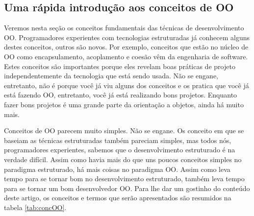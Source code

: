 \documentclass[
	article,			%
	12pt,				%
	openright,
	twoside,			%
	a4paper,			%
	english,			%
	french,
	brazil,				%
	sumario=tradicional
	]{abntex2}
\begin{document}
\subsection{Uma rápida introdução aos conceitos de OO}
Veremos nesta seção os conceitos fundamentais das técnicas de desenvolvimento OO. Programadores experientes com tecnologias estruturadas já conhecem alguns destes conceitos, outros são novos. Por exemplo, conceitos que estão no núcleo de OO como encapsulamento, acoplamento e coesão vêm da engenharia de software. Estes conceitos são importantes porque eles revelam boas práticas de projeto independentemente da tecnologia que está sendo usada. Não se engane, entretanto, não é porque você já viu alguns dos conceitos e os pratica que você já está fazendo OO, entretanto, você já está realizando bons projetos. Enquanto fazer bons projetos é uma grande parte da orientação a objetos, ainda há muito mais.

Conceitos de OO parecem muito simples. Não se engane. Os conceito em que se baseiam as técnicas estruturadas também pareciam simples, mas todos nós, programadores experientes, sabemos que o desenvolvimento estruturado é na verdade difícil. Assim como havia mais do que uns poucos conceitos simples no paradigma estruturado, há mais coisas no paradigma OO. Assim como leva tempo para se tornar bom no desenvolvimento estruturado, também leva tempo para se tornar um bom desenvolvedor OO. Para lhe dar um gostinho do conteúdo deste artigo, os conceitos e termos que serão apresentados são resumidos na tabela \ref{tab:concOO}.
\end{document}
